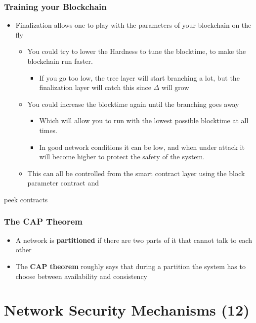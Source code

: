 \documentclass[11pt]{article}
\begin{document}
\subsubsection{Training your Blockchain}
\label{sec:org004d222}
\begin{itemize}
\item Finalization allows one to play with the parameters of your blockchain on the fly
\begin{itemize}
\item You could try to lower the Hardness to tune the blocktime, to make the blockchain run faster.
\begin{itemize}
\item If you go too low, the tree layer will start branching a lot, but the finalization layer will catch this since \(\Delta\) will grow
\end{itemize}
\item You could increase the blocktime again until the branching goes away
\begin{itemize}
\item Which will allow you to run with the lowest possible blocktime at all times.
\item In good network conditions it can be low, and when under attack it will become higher to protect the safety of the system.
\end{itemize}
\item This can all be controlled from the smart contract layer using the block parameter contract and
\end{itemize}
\end{itemize}
peek contracts

\subsubsection{The CAP Theorem}
\label{sec:org6b9e23b}
\begin{itemize}
\item A network is \textbf{partitioned} if there are two parts of it that cannot talk to each other

\item The \textbf{CAP theorem} roughly says that during a partition the system has to choose between availability and consistency
\end{itemize}

\section{Network Security Mechanisms (12)}
\label{sec:org90a725c}
\end{document}
